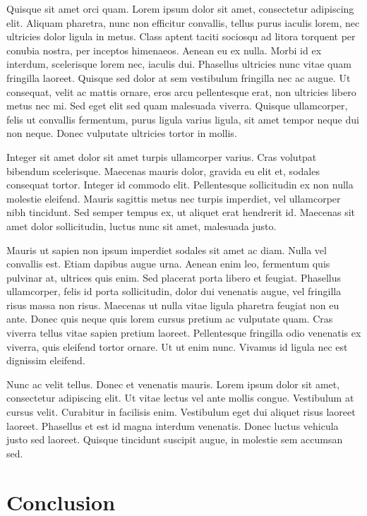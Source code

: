 \documentclass[journal]{vgtc}                %
\begin{document}
Quisque sit amet orci quam. Lorem ipsum dolor sit amet, consectetur adipiscing elit. Aliquam pharetra, nunc non efficitur convallis, tellus purus iaculis lorem, nec ultricies dolor ligula in metus. Class aptent taciti sociosqu ad litora torquent per conubia nostra, per inceptos himenaeos. Aenean eu ex nulla. Morbi id ex interdum, scelerisque lorem nec, iaculis dui. Phasellus ultricies nunc vitae quam fringilla laoreet. Quisque sed dolor at sem vestibulum fringilla nec ac augue. Ut consequat, velit ac mattis ornare, eros arcu pellentesque erat, non ultricies libero metus nec mi. Sed eget elit sed quam malesuada viverra. Quisque ullamcorper, felis ut convallis fermentum, purus ligula varius ligula, sit amet tempor neque dui non neque. Donec vulputate ultricies tortor in mollis.

Integer sit amet dolor sit amet turpis ullamcorper varius. Cras volutpat bibendum scelerisque. Maecenas mauris dolor, gravida eu elit et, sodales consequat tortor. Integer id commodo elit. Pellentesque sollicitudin ex non nulla molestie eleifend. Mauris sagittis metus nec turpis imperdiet, vel ullamcorper nibh tincidunt. Sed semper tempus ex, ut aliquet erat hendrerit id. Maecenas sit amet dolor sollicitudin, luctus nunc sit amet, malesuada justo.

Mauris ut sapien non ipsum imperdiet sodales sit amet ac diam. Nulla vel convallis est. Etiam dapibus augue urna. Aenean enim leo, fermentum quis pulvinar at, ultrices quis enim. Sed placerat porta libero et feugiat. Phasellus ullamcorper, felis id porta sollicitudin, dolor dui venenatis augue, vel fringilla risus massa non risus. Maecenas ut nulla vitae ligula pharetra feugiat non eu ante. Donec quis neque quis lorem cursus pretium ac vulputate quam. Cras viverra tellus vitae sapien pretium laoreet. Pellentesque fringilla odio venenatis ex viverra, quis eleifend tortor ornare. Ut ut enim nunc. Vivamus id ligula nec est dignissim eleifend.

Nunc ac velit tellus. Donec et venenatis mauris. Lorem ipsum dolor sit amet, consectetur adipiscing elit. Ut vitae lectus vel ante mollis congue. Vestibulum at cursus velit. Curabitur in facilisis enim. Vestibulum eget dui aliquet risus laoreet laoreet. Phasellus et est id magna interdum venenatis. Donec luctus vehicula justo sed laoreet. Quisque tincidunt suscipit augue, in molestie sem accumsan sed.
\section{Conclusion}
\end{document}
